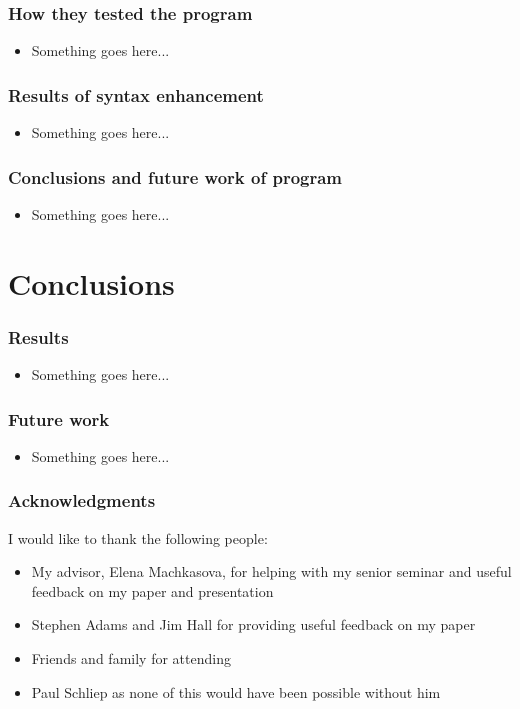\documentclass{beamer}
\begin{document}
\begin{frame}
	\frametitle{How they tested the program}
		\begin{itemize}
			\item Something goes here...
		\end{itemize}

\end{frame}

\begin{frame}
	\frametitle{Results of syntax enhancement}
		\begin{itemize}
			\item Something goes here...
		\end{itemize}

\end{frame}

\begin{frame}
	\frametitle{Conclusions and future work of program}
		\begin{itemize}
			\item Something goes here...
		\end{itemize}

\end{frame}


\section[Conclusions]{Conclusions}

\begin{frame}
	\frametitle{Results}
		\begin{itemize}
			\item Something goes here...
		\end{itemize}

\end{frame}

\begin{frame}
	\frametitle{Future work}
		\begin{itemize}
			\item Something goes here...
		\end{itemize}

\end{frame}

\begin{frame}
	\frametitle{Acknowledgments}
	I would like to thank the following people:
		\begin{itemize}
			\item My advisor, Elena Machkasova, for helping with my senior seminar and useful feedback on my paper and presentation
			\item Stephen Adams and Jim Hall for providing useful feedback on my paper
			\item Friends and family for attending
			\item Paul Schliep as none of this would have been possible without him
		\end{itemize}

\end{frame}
\end{document}
